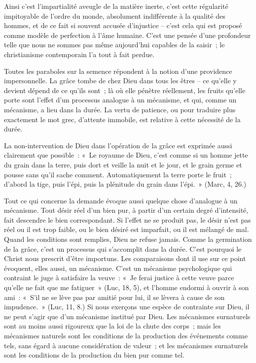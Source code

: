 \documentclass[french,twoside]{book} %
\begin{document}
Ainsi c'est l'impartialité aveugle de la matière inerte, c'est cette régularité impitoyable de l'ordre du monde, absolument indifférente à la qualité des hommes, et de ce fait si souvent accusée d'injustice – c'est cela qui est proposé comme modèle de perfection à l'âme humaine. C'est une pensée d'une profondeur telle que nous ne sommes pas même aujourd'hui capables de la saisir ; le christianisme contemporain l'a tout à fait perdue.\par
Toutes les paraboles sur la semence répondent à la notion d'une providence impersonnelle. La grâce tombe de chez Dieu dans tous les êtres – ce qu'elle y devient dépend de ce qu'ils sont ; là où elle pénètre réellement, les fruits qu'elle porte sont l'effet d'un processus analogue à un mécanisme, et qui, comme un mécanisme, a lieu dans la durée. La vertu de patience, ou pour traduire plus exactement le mot grec, d'attente immobile, est relative à cette nécessité de la durée.\par
La non-intervention de Dieu dans l'opération de la grâce est exprimée aussi clairement que possible : « Le royaume de Dieu, c'est comme si un homme jette du grain dans la terre, puis dort et veille la nuit et le jour, et le grain germe et pousse sans qu'il sache comment. Automatiquement la terre porte le fruit ; d'abord la tige, puis l'épi, puis la plénitude du grain dans l'épi. » (Marc, 4, 26.)\par
Tout ce qui concerne la demande évoque aussi quelque chose d'analogue à un mécanisme. Tout désir réel d'un bien pur, à partir d'un certain degré d'intensité, fait descendre le bien correspondant. Si l'effet ne se produit pas, le désir n'est pas réel ou il est trop faible, ou le bien désiré est imparfait, ou il est mélangé de mal. Quand les conditions sont remplies, Dieu ne refuse jamais. Comme la germination de la grâce, c'est un processus qui s'accomplit dans la durée. C'est pourquoi le Christ nous prescrit d'être importuns. Les comparaisons dont il use sur ce point évoquent, elles aussi, un mécanisme. C'est un mécanisme psychologique qui contraint le juge à satisfaire la veuve : « Je ferai justice à cette veuve parce qu'elle ne fait que me fatiguer » (Luc, 18, 5), et l'homme endormi à ouvrir à son ami : « S'il ne se lève pas par amitié pour lui, il se lèvera à cause de son impudence. » (Luc, 11, 8.) Si nous exerçons une espèce de contrainte sur Dieu, il ne peut s'agir que d'un mécanisme institué par Dieu. Les mécanismes surnaturels sont au moins aussi rigoureux que la loi de la chute des corps ; mais les mécanismes naturels sont les conditions de la production des événements comme tels, sans égard à aucune considération de valeur ; et les mécanismes surnaturels sont les conditions de la production du bien pur comme tel.\par
\end{document}
